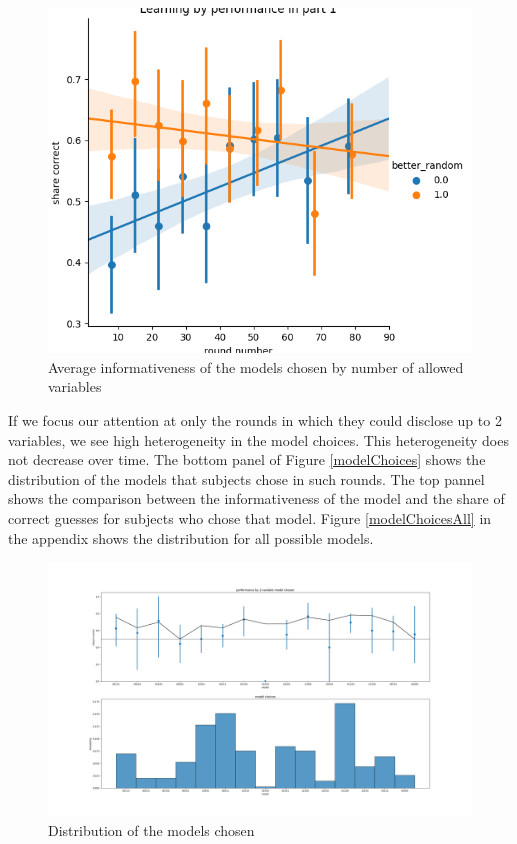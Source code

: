 \documentclass[
  12pt,
]{article}
\begin{document}
\begin{figure}

{\centering \includegraphics[width=0.65\linewidth]{../computed_objects/figures/p1_performance_throughout} 

}

\caption{\label{modelInformativeness} Average informativeness of the models chosen by number of allowed variables}\label{fig:modelInformativeness}
\end{figure}

If we focus our attention at only the rounds in which they could
disclose up to 2 variables, we see high heterogeneity in the model
choices. This heterogeneity does not decrease over time. The bottom
panel of Figure \ref{modelChoices} shows the distribution of the models
that subjects chose in such rounds. The top pannel shows the comparison
between the informativeness of the model and the share of correct
guesses for subjects who chose that model. Figure \ref{modelChoicesAll}
in the appendix shows the distribution for all possible models.

\begin{figure}

{\centering \includegraphics[width=0.65\linewidth]{../computed_objects/figures/model_choices_2vars} 

}

\caption{\label{modelChoices} Distribution of the models chosen}\label{fig:modelChoices}
\end{figure}
\end{document}
